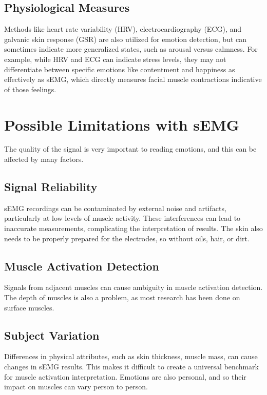 \documentclass[twocolumn]{article}
\begin{document}
\subsection{Physiological Measures}
 Methods like heart rate variability (HRV), electrocardiography (ECG), and galvanic skin response (GSR) are also utilized for emotion detection, but can sometimes indicate more generalized states, such as arousal versus calmness. For example, while HRV and ECG can indicate stress levels, they may not differentiate between specific emotions like contentment and happiness as effectively as sEMG, which directly measures facial muscle contractions indicative of those feelings. 
 \cite{Mavratzakis_Herbert_Walla_2016}
 \cite{Pourmohammadi_Maleki_2020}
\section{Possible Limitations with sEMG}
The quality of the signal is very important to reading emotions, and this can be affected by many factors.
\subsection{Signal Reliability}
sEMG recordings can be contaminated by external noise and artifacts, particularly at low levels of muscle activity. These interferences can lead to inaccurate measurements, complicating the interpretation of results. \cite{Naik_Kumar_Arjunan_Palaniswami_Begg_2006} The skin also needs to be properly prepared for the electrodes, so without oils, hair, or dirt.\cite{Djuwari_Kumar_Arjunan_Naik_2008}
\subsection{Muscle Activation Detection}
Signals from adjacent muscles can cause ambiguity in muscle activation detection. 
The depth of muscles is also a problem, as most research has been done on surface muscles.\cite{Zheng_Wan_Xu_Wang_Qiao_2020}
\subsection{Subject Variation}
Differences in physical attributes, such as skin thickness, muscle mass, can cause changes in sEMG results. This makes it difficult to create a universal benchmark for muscle activation interpretation. \cite{Djuwari_Kumar_Arjunan_Naik_2008} Emotions are also personal, and so their impact on muscles can vary person to person.\cite{ceramic-on-metal_bearing_hip_replacement_of_Sciences_2023}

\end{document}
